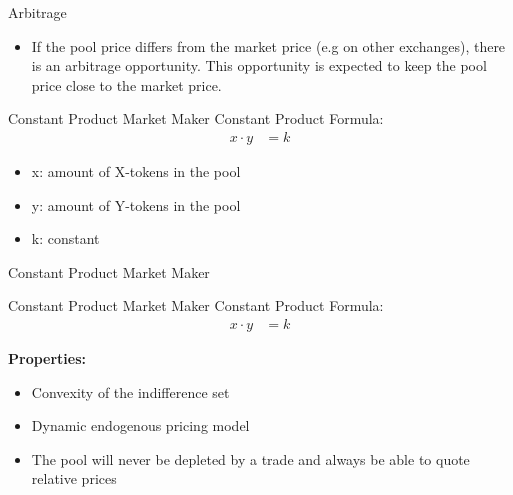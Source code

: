 \documentclass[]{beamer}
\begin{document}
\begin{frame}{Arbitrage}
	\begin{figure}
		\begin{tikzpicture}
		
		\end{tikzpicture}
	\end{figure}
	\begin{itemize}
		\item If the pool price differs from the market price (e.g on other exchanges), there is an arbitrage opportunity. This opportunity is expected to keep the pool price close to the market price.
	\end{itemize}	
\end{frame}


\begin{frame}{Constant Product Market Maker}
Constant Product Formula:
	\begin{align*}
		x \cdot y &= k
	\end{align*}

	\begin{itemize}
		\item[] x: amount of X-tokens in the pool
		\item[] y: amount of Y-tokens in the pool
		\item[] k: constant
	\end{itemize}
	\vspace{1cm}
\end{frame}


\begin{frame}{Constant Product Market Maker}
	\begin{figure}[h!]
		\begin{center}
			
		\end{center}
	\end{figure}
\end{frame}


\begin{frame}{Constant Product Market Maker}
Constant Product Formula:
	\begin{align*}
		x \cdot y &= k
	\end{align*}
	
	\textbf{Properties:}
	\begin{itemize}
		\item<1-> Convexity of the indifference set
		\item<2-> Dynamic endogenous pricing model
		\item<3-> The pool will never be depleted by a trade and always be able to quote relative prices
	\end{itemize}
\end{frame}
\end{document}
